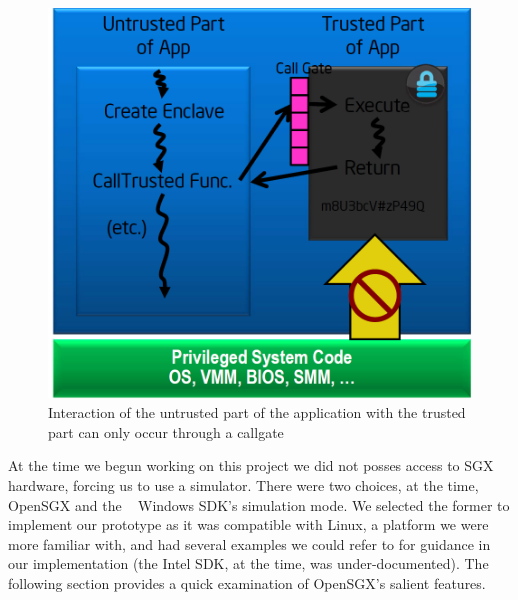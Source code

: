 \documentclass[../main.tex]{subfiles}
\begin{document}
\begin{figure}[H]
	\centering
	\includegraphics[scale=0.25]{images/sgxhighlevel.png}
	\caption{Interaction of the untrusted part of the application with the trusted part can only occur through a callgate}
	\label{fig:sgxhighlevel}
\end{figure}
At the time we begun working on this project we did not posses access to SGX
hardware, forcing us to use a simulator. There were two choices, at the time,
OpenSGX and the \Intel~ Windows SDK's simulation mode. We selected the former
to implement our prototype as it was compatible with Linux, a platform we were
more familiar with, and had several examples we could refer to for guidance in
our implementation (the Intel SDK, at the time, was under-documented). The
following section provides a quick examination of OpenSGX's salient features.
\end{document}

